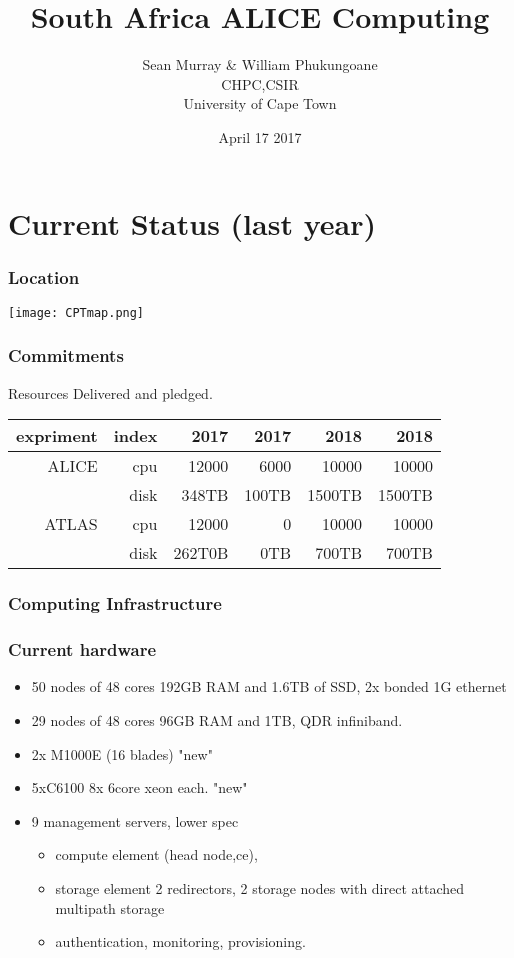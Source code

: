\documentclass{beamer}
\title{South Africa ALICE Computing}
\author{Sean Murray \& William Phukungoane\\
    CHPC,CSIR \\
    University of Cape Town 
}
\date{April 17 2017}
\begin{document}
\begin{frame}
\titlepage
\end{frame}

\section{Current Status (last year)}
\begin{frame}
    \frametitle{Location}
\end{frame}
\begin{frame}
    \texttt{[image: CPTmap.png]}
\end{frame}


\begin{frame}
\frametitle{Commitments}
Resources Delivered and pledged.
    \begin{tabular}{|r|r|r|r|r|r|}
        expriment&  index     & 2017  & 2017  & 2018   & 2018    \\ \hline
        ALICE         & cpu  & 12000  & 6000 & 10000  & 10000   \\ \hline
                 & disk & 348TB & 100TB & 1500TB & 1500TB \\ \hline
        ATLAS        & cpu  & 12000  & 0 & 10000  & 10000   \\ \hline
                 & disk & 262T0B & 0TB & 700TB & 700TB \\ \hline
    \end{tabular}
\end{frame}

\begin{frame}
  \frametitle{Computing Infrastructure}
\end{frame}

\begin{frame}
  \frametitle{Current hardware}
  \begin{itemize}
    \item 50 nodes of 48 cores 192GB RAM and 1.6TB of SSD, 2x bonded 1G ethernet
    \item 29 nodes of 48 cores 96GB RAM and 1TB, QDR infiniband.
    \item 2x M1000E (16 blades) "new"
    \item 5xC6100 8x 6core xeon each. "new" 
    \item 9 management servers, lower spec
  \begin{itemize}
    \item compute element (head node,ce),
    \item storage element 2 redirectors, 2 storage nodes with direct attached multipath storage
    \item authentication, monitoring, provisioning. 
  \end{itemize}
  \end{itemize}
\end{frame}
\end{document}
